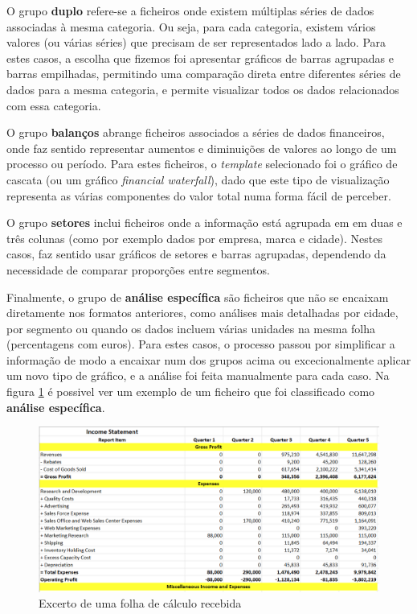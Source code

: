 O grupo \textbf{duplo} refere-se a ficheiros onde existem múltiplas séries de dados associadas à mesma categoria. Ou seja, para cada categoria, existem vários valores (ou várias séries) que precisam de ser representados lado a lado. Para estes casos, a escolha que fizemos foi apresentar gráficos de barras agrupadas e barras empilhadas, permitindo uma comparação direta entre diferentes séries de dados para a mesma categoria, e permite visualizar todos os dados relacionados com essa categoria.

O grupo \textbf{balanços} abrange ficheiros associados a séries de dados financeiros, onde faz sentido representar aumentos e diminuições de valores ao longo de um processo ou período. Para estes ficheiros, o \textit{template} selecionado foi o gráfico de cascata (ou um gráfico \textit{financial waterfall}), dado que este tipo de visualização representa as várias componentes do valor total numa forma fácil de perceber.

O grupo \textbf{setores} inclui ficheiros onde a informação está agrupada em em duas e três colunas (como por exemplo dados por empresa, marca e cidade). Nestes casos, faz sentido usar gráficos de setores e barras agrupadas,  dependendo da necessidade de comparar proporções entre segmentos.

Finalmente, o grupo de \textbf{análise específica} são ficheiros que não se encaixam diretamente nos formatos anteriores, como análises mais detalhadas por cidade, por segmento ou quando os dados incluem várias unidades na mesma folha (percentagens com euros). Para estes casos, o processo passou por simplificar a informação de modo a encaixar num dos grupos acima ou excecionalmente aplicar um novo tipo de gráfico, e a análise foi feita manualmente para cada caso. Na figura \ref{fig:before} é possivel ver um exemplo de um ficheiro que foi classificado como \textbf{análise específica}.

\begin{figure}[H]
\centering
\includegraphics[max width=\textwidth]{./img/before}
\caption{Excerto de uma folha de cálculo recebida}
\label{fig:before}
\end{figure}

